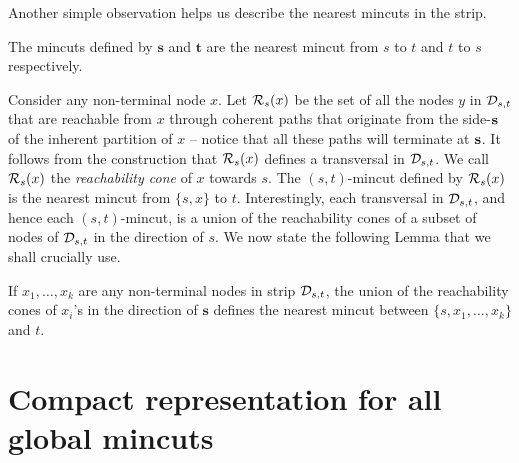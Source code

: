 Another simple observation helps us describe the nearest mincuts in the strip.

\begin{lemma}
The mincuts defined by $\mathbf{s}$ and $\mathbf{t}$ are the nearest mincut from $s$ to $t$ and $t$ to $s$ respectively.
\label{lem:nearest-mincut-strip}
\end{lemma}

Consider any non-terminal node $x$. Let ${\cal R}_s(x)$ be the set of all the nodes $y$ in ${\cal D}_{s,t}$ that are reachable from $x$ through coherent paths that originate from the side-${\bf s}$ of the inherent partition of $x$ -- notice that all these paths will terminate at ${\bf s}$. 
It follows from the construction that ${\cal R}_s(x)$ defines a transversal in
${\cal D}_{s,t}$. We call ${\cal R}_s(x)$ the \textit{reachability cone} of $x$ towards $s$. 
The $(s,t)$-mincut defined by ${\cal R}_s(x)$ is the nearest mincut from $\{s,x\}$ to $t$. 
Interestingly, each transversal in ${\cal D}_{s,t}$, and hence each $(s,t)$-mincut, is a union of the reachability cones of a subset of nodes of ${\cal D}_{s,t}$ in the direction of $s$. We now state the following Lemma that we shall crucially use.

\begin{lemma}
If $x_1,\ldots, x_k$ are any non-terminal nodes in strip ${\cal D}_{s,t}$,  the union of the reachability cones of $x_i$'s in the direction of ${\mathbf s}$ defines the nearest mincut between $\{s, x_1,\ldots, x_k\}$ and $t$.
\label{lem:reachability-cones}
\end{lemma} 

\section{Compact representation for all global mincuts} \label{appendix:cactus}


